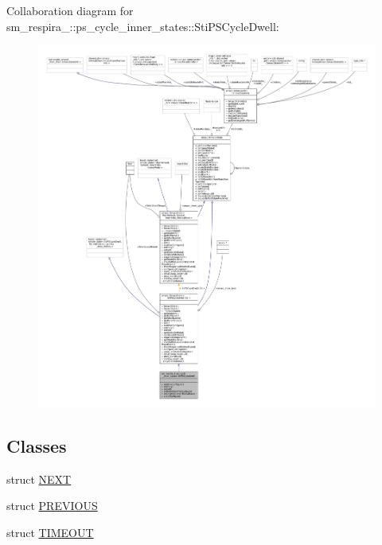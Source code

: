 Collaboration diagram for sm\+\_\+respira\+\_\+:\+:ps\+\_\+cycle\+\_\+inner\+\_\+states\+:\+:Sti\+P\+S\+Cycle\+Dwell\+:
\nopagebreak
\begin{figure}[H]
\begin{center}
\leavevmode
\includegraphics[width=350pt]{structsm__respira__1_1_1ps__cycle__inner__states_1_1StiPSCycleDwell__coll__graph}
\end{center}
\end{figure}
\subsection*{Classes}
\begin{DoxyCompactItemize}
\item 
struct \hyperlink{structsm__respira__1_1_1ps__cycle__inner__states_1_1StiPSCycleDwell_1_1NEXT}{N\+E\+XT}
\item 
struct \hyperlink{structsm__respira__1_1_1ps__cycle__inner__states_1_1StiPSCycleDwell_1_1PREVIOUS}{P\+R\+E\+V\+I\+O\+US}
\item 
struct \hyperlink{structsm__respira__1_1_1ps__cycle__inner__states_1_1StiPSCycleDwell_1_1TIMEOUT}{T\+I\+M\+E\+O\+UT}
\end{DoxyCompactItemize}
